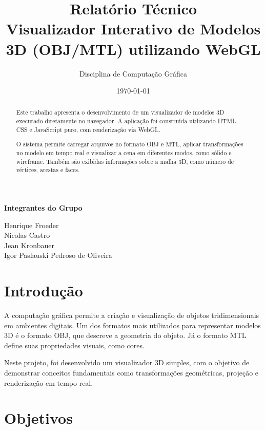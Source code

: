 \documentclass[12pt,a4paper]{article}
\title{\textbf{Relatório Técnico}\\[0.4em]
\large Visualizador Interativo de Modelos 3D (OBJ/MTL) utilizando WebGL}
\author{Disciplina de Computação Gráfica}
\date{\today}
\begin{document}
\maketitle

\begin{center}
\textbf{Integrantes do Grupo}

Henrique Froeder \\
Nicolas Castro \\
Jean Kronbauer \\
Igor Paslauski Pedroso de Oliveira
\end{center}

\begin{abstract}
Este trabalho apresenta o desenvolvimento de um visualizador de modelos 3D executado diretamente no navegador. A aplicação foi construída utilizando HTML, CSS e JavaScript puro, com renderização via WebGL.

O sistema permite carregar arquivos no formato OBJ e MTL, aplicar transformações no modelo em tempo real e visualizar a cena em diferentes modos, como sólido e wireframe. Também são exibidas informações sobre a malha 3D, como número de vértices, arestas e faces.
\end{abstract}

\tableofcontents
\newpage

\section{Introdução}

A computação gráfica permite a criação e visualização de objetos tridimensionais em ambientes digitais. Um dos formatos mais utilizados para representar modelos 3D é o formato OBJ, que descreve a geometria do objeto. Já o formato MTL define suas propriedades visuais, como cores.

Neste projeto, foi desenvolvido um visualizador 3D simples, com o objetivo de demonstrar conceitos fundamentais como transformações geométricas, projeção e renderização em tempo real.

\section{Objetivos}
\end{document}
